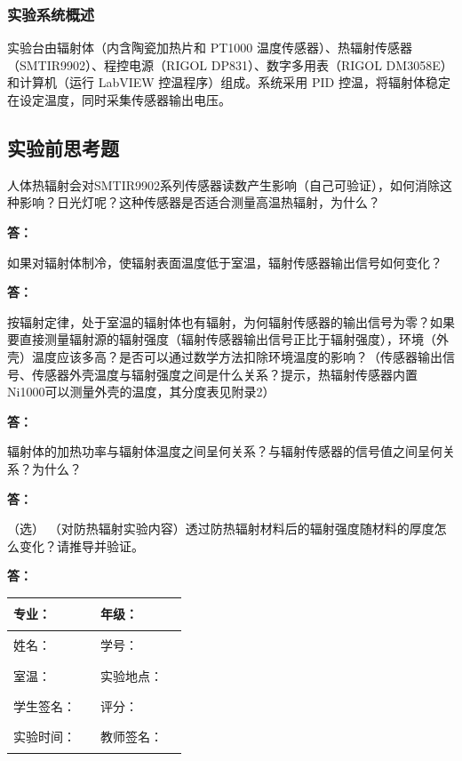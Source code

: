 \documentclass[dvipsnames, svgnames,a4paper,11pt]{article}
\newcommand{\answerblank}[1][3.8cm]{%
  \par\nopagebreak[4]\noindent\textbf{答：}\par\nopagebreak[4]\vspace*{#1}}
\begin{document}
\subsubsection{实验系统概述}

实验台由辐射体（内含陶瓷加热片和 PT1000 温度传感器）、热辐射传感器（SMTIR9902）、程控电源（RIGOL DP831）、数字多用表（RIGOL DM3058E）和计算机（运行 LabVIEW 控温程序）组成。系统采用 PID 控温，将辐射体稳定在设定温度，同时采集传感器输出电压。

\subsection{实验前思考题}
\begin{question}
	人体热辐射会对SMTIR9902系列传感器读数产生影响（自己可验证），如何消除这种影响？日光灯呢？这种传感器是否适合测量高温热辐射，为什么？
\end{question}
\answerblank[3.8cm]



\begin{question}
	如果对辐射体制冷，使辐射表面温度低于室温，辐射传感器输出信号如何变化？
\end{question}
\answerblank[3.8cm]


\begin{question}
按辐射定律，处于室温的辐射体也有辐射，为何辐射传感器的输出信号为零？如果要直接测量辐射源的辐射强度（辐射传感器输出信号正比于辐射强度），环境（外壳）温度应该多高？是否可以通过数学方法扣除环境温度的影响？（传感器输出信号、传感器外壳温度与辐射强度之间是什么关系？提示，热辐射传感器内置Ni1000可以测量外壳的温度，其分度表见附录2）
\end{question}
\answerblank[3.8cm]




\begin{question}
辐射体的加热功率与辐射体温度之间呈何关系？与辐射传感器的信号值之间呈何关系？为什么？
\end{question}
\answerblank[3.8cm]



\begin{question}
	（选） （对防热辐射实验内容）透过防热辐射材料后的辐射强度随材料的厚度怎么变化？请推导并验证。

\end{question}
\answerblank[3.8cm]

\clearpage


\begin{table}
	\renewcommand\arraystretch{1.7}
	\centering
	\begin{tabularx}{\textwidth}{|X|X|X|X|}
	\hline
	专业：& \rule{2.5cm}{0.4pt} &年级：& \rule{2.5cm}{0.4pt} \\
	\hline  
	姓名：& \rule{2.5cm}{0.4pt} &学号：&\rule{3cm}{0.4pt} \\
	\hline
	室温：& \rule{2.5cm}{0.4pt} & 实验地点： & \rule{2.5cm}{0.4pt} \\
	\hline
	学生签名：&\rule{2.5cm}{0.4pt} & 评分： &\\
	\hline
	实验时间：& \rule{3cm}{0.4pt} & 教师签名：& \rule{3cm}{0.4pt} \\
	\hline
	\end{tabularx}
\end{table}
\end{document}
